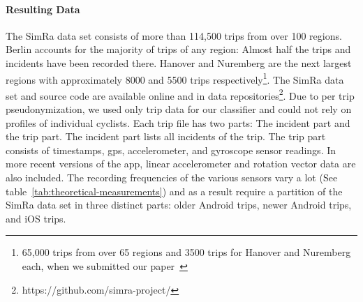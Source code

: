 \paragraph{Resulting Data}
The SimRa data set consists of more than 114,500 trips from over 100 regions.
Berlin accounts for the majority of trips of any region: Almost half the trips and incidents have been recorded there.
Hanover and Nuremberg are the next largest regions with approximately 8000 and 5500 trips respectively\footnote{65,000 trips from over 65 regions and 3500 trips for Hanover and Nuremberg each, when we submitted our paper~\cite{karakaya2022cyclesense}}.
The SimRa data set and source code are available online and in data repositories\footnote{https://github.com/simra-project/}.
Due to per trip pseudonymization, we used only trip data for our classifier and could not rely on profiles of individual cyclists.
Each trip file has two parts: The incident part and the trip part.
The incident part lists all incidents of the trip.
The trip part consists of timestamps, \ac{gps}, accelerometer, and gyroscope sensor readings. In more recent versions of the app, linear accelerometer and rotation vector data are also included.
The recording frequencies of the various sensors vary a lot (See table~\ref{tab:theoretical-measurements}) and as a result require a partition of the SimRa data set in three distinct parts: older Android trips, newer Android trips, and iOS trips.



\begin{table}[ht]
	\centering
	\caption{Theoretical measurement frequencies of different sensors in different parts of the SimRa data set.
		Note that these are only the theoretical frequencies that deviate significantly from the empirical measurement frequencies that can be observed in the data set (see Section \ref{sec:discussion_cyclesense}).}
	\label{tab:theoretical-measurements}
\end{table}

